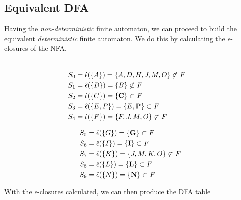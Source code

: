\subsection{Equivalent DFA}
\label{sec:slr1|sub:dfa}
Having the {\it non-deterministic} finite automaton, we can proceed to build
the equivalent {\it deterministic} finite automaton. We do this by calculating
the $\epsilon$-closures of the NFA.
\vspace{-0.50in}
\begin{multicols}{2}
	
	\center
	\begin{align}
		{\ } \nonumber \\
		S_{0} &= \hat{\epsilon}(\{A\})
		= \{A,D,H,J,M,O\} \not\subset F \\
		S_{1} &= \hat{\epsilon}(\{B\})
		= \{B\} \not\subset F \\
		S_{2} &= \hat{\epsilon}(\{C\})
		= \{\text{\bf C}\} \subset F \\
		S_{3} &= \hat{\epsilon}(\{E,P\})
		= \{E,\text{\bf P}\} \subset F \\
		S_{4} &= \hat{\epsilon}(\{F\})
		= \{F,J,M,O\} \not\subset F
	\end{align}
	\vfill
	
	\columnbreak
	
	\center
	\begin{align}
		S_{5} &= \hat{\epsilon}(\{G\})
		= \{\text{\bf G}\} \subset F \\
		S_{6} &= \hat{\epsilon}(\{I\})
		= \{\text{\bf I}\} \subset F \\
		S_{7} &= \hat{\epsilon}(\{K\})
		= \{J,M,K,O\} \not\subset F \\
		S_{8} &= \hat{\epsilon}(\{L\})
		= \{\text{\bf L}\} \subset F \\
		S_{9} &= \hat{\epsilon}(\{N\})
		= \{\text{\bf N}\} \subset F
	\end{align}
	\vfill
	
\end{multicols}
With the $\epsilon$-closures calculated, we can then produce the DFA table

